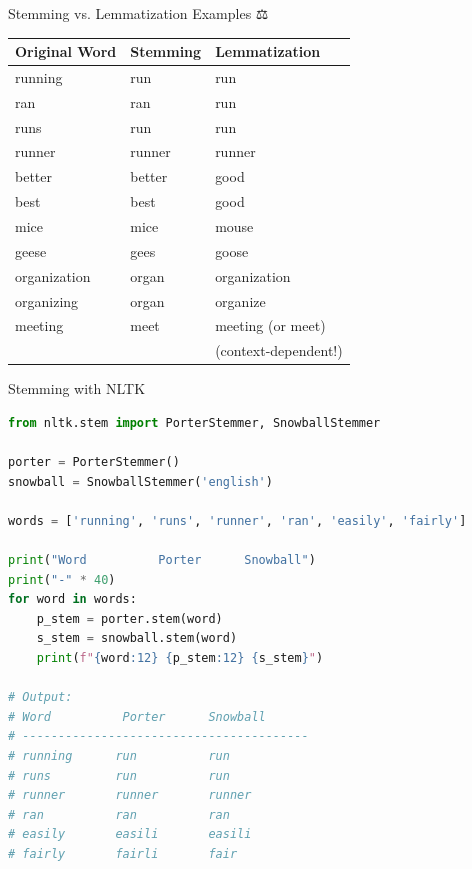 \documentclass[aspectratio=169]{beamer}
\begin{document}
\begin{frame}{Stemming vs. Lemmatization Examples ⚖️}
    \begin{table}
        \centering
        \begin{tabular}{lll}
            \toprule
            \textbf{Original Word} & \textbf{Stemming} & \textbf{Lemmatization} \\
            \midrule
            running & run & run \\
            ran & ran & run \\
            runs & run & run \\
            runner & runner & runner \\
            \midrule
            better & better & good \\
            best & best & good \\
            \midrule
            mice & mice & mouse \\
            geese & gees & goose \\
            \midrule
            organization & organ & organization \\
            organizing & organ & organize \\
            \midrule
            meeting & meet & meeting (or meet) \\
            & & (context-dependent!) \\
            \bottomrule
        \end{tabular}
    \end{table}
\end{frame}

\begin{frame}[fragile]{Stemming with NLTK 🔪}
    \begin{lstlisting}[language=Python]
from nltk.stem import PorterStemmer, SnowballStemmer

porter = PorterStemmer()
snowball = SnowballStemmer('english')

words = ['running', 'runs', 'runner', 'ran', 'easily', 'fairly']

print("Word          Porter      Snowball")
print("-" * 40)
for word in words:
    p_stem = porter.stem(word)
    s_stem = snowball.stem(word)
    print(f"{word:12} {p_stem:12} {s_stem}")

# Output:
# Word          Porter      Snowball
# ----------------------------------------
# running      run          run
# runs         run          run
# runner       runner       runner
# ran          ran          ran
# easily       easili       easili
# fairly       fairli       fair
    \end{lstlisting}
\end{frame}
\end{document}
